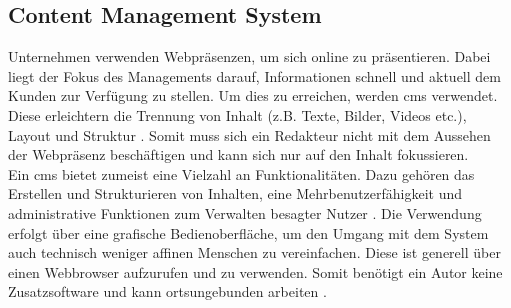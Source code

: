 \subsection{Content Management System}

Unternehmen verwenden Webpräsenzen, um sich online zu präsentieren. Dabei liegt der Fokus des Managements darauf, Informationen schnell und aktuell dem Kunden zur Verfügung zu stellen. Um dies zu erreichen, werden \acf{cms} verwendet. Diese erleichtern die Trennung von Inhalt (z.B. Texte, Bilder, Videos etc.), Layout und Struktur \cite[S.1 ff.]{spo09}. Somit muss sich ein Redakteur nicht mit dem Aussehen der Webpräsenz beschäftigen und kann sich nur auf den Inhalt fokussieren. \\
Ein \ac{cms} bietet zumeist eine Vielzahl an Funktionalitäten. Dazu gehören das Erstellen und Strukturieren von Inhalten, eine Mehrbenutzerfähigkeit und administrative Funktionen zum Verwalten besagter Nutzer \cite[S. 55]{spo09}.  Die Verwendung erfolgt über eine grafische Bedienoberfläche, um den Umgang mit dem System auch technisch weniger affinen Menschen zu vereinfachen. Diese ist generell über einen Webbrowser aufzurufen und zu verwenden. Somit benötigt ein Autor keine Zusatzsoftware und kann ortsungebunden arbeiten \cite[S. 19 f.]{bon11}.

